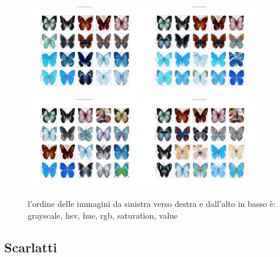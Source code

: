 \begin{figure}[!ht]
    \centering
    \includegraphics[width=0.45\textwidth]{../images/realworldexperiments/butterflies/examples/fp_hue_histogram.png}
    \includegraphics[width=0.45\textwidth]{../images/realworldexperiments/butterflies/examples/fp_rgb_histogram.png}
    \includegraphics[width=0.45\textwidth]{../images/realworldexperiments/butterflies/examples/fp_saturation_histogram.png}
    \includegraphics[width=0.45\textwidth]{../images/realworldexperiments/butterflies/examples/fp_value_histogram.png}
    \caption{l'ordine delle immagini da sinistra verso destra e dall'alto in basso è: grayscale, hsv, hue, rgb, saturation, value}
\end{figure}

\subsection{Scarlatti}